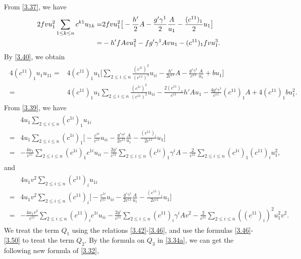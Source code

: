 \documentclass[11pt]{amsart}
\numberwithin{equation}{section}
\begin{document}
From \eqref{3.37},  we have
\begin{align}\label{3.47}
2fvu_1^2\sum_{1\leq k\leq n}c^{k1}u_{1k}
=&2fvu_1^2\big[-\frac{h'}{2} A-\frac{g'\gamma^1}{2}\frac{A}{u_1}-\frac{(c^{11})_1}{2} u_1\big]\notag\\
=&-h'fAvu_1^2-fg'\gamma^1Avu_1-(c^{11})_1fvu_1^3.
\end{align}
By \eqref{3.40},   we obtain
\begin{align}\label{3.48}
\begin{split}
4(c^{11})_{1} u_1u_{11}=&4(c^{11})_{1} u_1\big[\sum_{2\leq i\leq n}\frac{(c^{1i})^2}{(c^{11})^2}u_{ii}-\frac{h'}{2c^{11}} A-\frac{g'\gamma^1}{c^{11}}\frac{A}{u_1}+bu_1\big]\\
=&4(c^{11})_{1} u_1\sum_{2\leq i\leq n}\frac{(c^{1i})^2}{(c^{11})^2}u_{ii}-\frac{2(c^{11})_{1}}{c^{11}}h' Au_1-\frac{4g'\gamma^1}{c^{11}}(c^{11})_{1}A+4(c^{11})_{1} bu_1^2.
\end{split}
\end{align}
From \eqref{3.39}, we have
\begin{align}\label{3.49}
\begin{split}
&4 u_1\sum_{2\leq i\leq n}(c^{1i})_{1}u_{1i}\\
=&4 u_1\sum_{2\leq i\leq n}(c^{1i})_{1}\big[-\frac{c^{1i}}{c^{11}}u_{ii}-\frac{g'\gamma^i}{2c^{11}}\frac{A}{u_1}-\frac{(c^{11})_i}{2c^{11}} u_1\big]\\
=&-\frac{4u_1}{c^{11}}\sum_{2\leq i\leq n}(c^{1i})_{1}c^{1i}u_{ii}-\frac{2g'}{c^{11}}\sum_{2\leq i\leq n}(c^{1i})_{1}\gamma^iA-\frac{2}{c^{11}}\sum_{2\leq i\leq n}(c^{1i})_{1}(c^{11})_i u_1^2,
\end{split}
\end{align}
and \begin{align}\label{3.50}
\begin{split}
&4 u_1v^2\sum_{2\leq i\leq n}(c^{11})_{i}u_{1i}\\
=&4 u_1v^2\sum_{2\leq i\leq n}(c^{11})_{i}\big[-\frac{c^{1i}}{c^{11}}u_{ii}-\frac{g'\gamma^i}{2c^{11}}\frac{A}{u_1}-\frac{(c^{11})_i}{2c^{11}} u_1\big]\\
=&-\frac{4 u_1v^2}{c^{11}}\sum_{2\leq i\leq n}(c^{11})_{i}c^{1i}u_{ii}-\frac{2g'}{c^{11}}\sum_{2\leq i\leq n}(c^{11})_{i}\gamma^iAv^2-\frac{2}{c^{11}} \sum_{2\leq i\leq n}((c^{11})_{i})^2u_1^2v^2.
\end{split}
\end{align}
We treat the term $Q_1$ using the relations \eqref{3.42}-\eqref{3.46}, and  use the formulas \eqref{3.46}-\eqref{3.50}  to treat the term $Q_2$. By the formula on $Q_3$ in \eqref{3.34a},  we can get the following new formula of \eqref{3.32},
\end{document}
